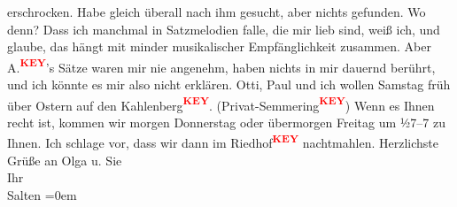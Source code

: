 \begin{ledgroupsized}[t]{13cm}
               erschrocken. Habe gleich überall nach ihm gesucht, aber nichts gefunden. Wo denn?
               Dass ich manchmal in Satzmelodien falle, die mir lieb sind, weiß ich, und glaube, das
               hängt mit minder musikalischer Empfänglichkeit zusammen. Aber A.\textcolor{red}{\textsuperscript{\textbf{KEY}}}’s Sätze waren mir nie angenehm, haben nichts in mir dauernd
               berührt, und ich könnte es mir also nicht erklären. \pend
           \pstart
           Otti, Paul und ich wollen
                  Samstag früh über Ostern auf den Kahlenberg\textcolor{red}{\textsuperscript{\textbf{KEY}}}. (Privat-Semmering\textcolor{red}{\textsuperscript{\textbf{KEY}}}) Wenn es Ihnen recht ist, kommen wir morgen
                  Donnerstag oder übermorgen Freitag um ½7–7
               zu Ihnen. Ich schlage vor, dass wir dann im Riedhof\textcolor{red}{\textsuperscript{\textbf{KEY}}}
               nachtmahlen. \pend
           \pstart
           Herzlichste Grüße an Olga u. Sie {\\[\baselineskip]}Ihr {\\[\baselineskip]}\spacefill\mbox{Salten}\pend
           \leftskip=0em{}
         
         \endnumbering{}\end{ledgroupsized}\begin{anhang}\end{anhang}\newcommand{\dateiname}{L03394}\newcommand{\titel}{Felix Salten an Arthur Schnitzler, 30. 3. 1904}\newcommand{\editorInnen}{Martin Anton Müller und Laura Untner}
      